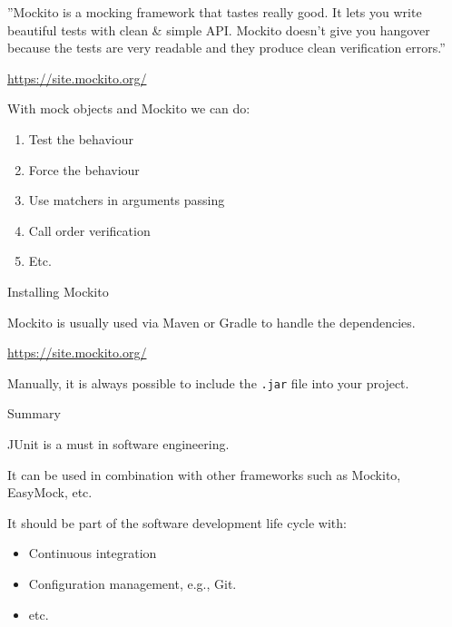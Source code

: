\documentclass[11pt, xcolor=svgnames]{beamer}
\begin{document}

\begin{frame}

''Mockito is a mocking framework that tastes really good. It lets you write beautiful tests with clean \& simple API. Mockito doesn't give you hangover because the tests are very readable and they produce clean verification errors.''


\url{https://site.mockito.org/}

With mock objects and Mockito we can do:

\begin{enumerate}
  \item Test the behaviour
  \item Force the behaviour
  \item Use matchers in arguments passing
  \item Call order verification
  \item Etc.
\end{enumerate}
\end{frame}



\begin{frame}{Installing Mockito}

Mockito is usually used via Maven or Gradle to handle the dependencies.


\url{https://site.mockito.org/}

Manually, it is always possible to include the \texttt{.jar} file into your project.

\end{frame}





\begin{frame}[fragile]{Summary}

JUnit is a must in software engineering. 

It can be used in combination with other frameworks such as Mockito, EasyMock, etc.

It should be part of the software development life cycle with:
\begin{itemize}
  \item Continuous integration
  \item Configuration management, e.g., Git.
  \item etc.
\end{itemize}

\end{frame}


\end{document}
